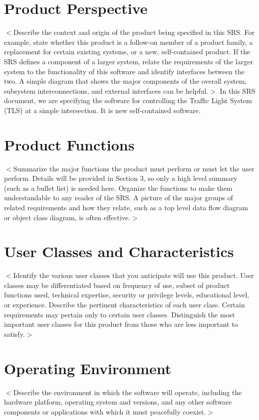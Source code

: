 \documentclass{scrreprt}
\begin{document}
\section{Product Perspective}
$<$Describe the context and origin of the product being specified in this SRS.
For example, state whether this product is a follow-on member of a product
family, a replacement for certain existing systems, or a new, self-contained
product. If the SRS defines a component of a larger system, relate the
requirements of the larger system to the functionality of this software and
identify interfaces between the two. A simple diagram that shows the major
components of the overall system, subsystem interconnections, and external
interfaces can be helpful.$>$
In this SRS document, we are specifying the software for controlling the Traffic Light System (TLS) at a simple intersection. It is new self-contained software.

\section{Product Functions}
$<$Summarize the major functions the product must perform or must let the user
perform. Details will be provided in Section 3, so only a high level summary
(such as a bullet list) is needed here. Organize the functions to make them
understandable to any reader of the SRS. A picture of the major groups of
related requirements and how they relate, such as a top level data flow diagram
or object class diagram, is often effective.$>$

\section{User Classes and Characteristics}
$<$Identify the various user classes that you anticipate will use this product.
User classes may be differentiated based on frequency of use, subset of product
functions used, technical expertise, security or privilege levels, educational
level, or experience. Describe the pertinent characteristics of each user class.
Certain requirements may pertain only to certain user classes. Distinguish the
most important user classes for this product from those who are less important
to satisfy.$>$

\section{Operating Environment}
$<$Describe the environment in which the software will operate, including the
hardware platform, operating system and versions, and any other software
components or applications with which it must peacefully coexist.$>$
\end{document}
